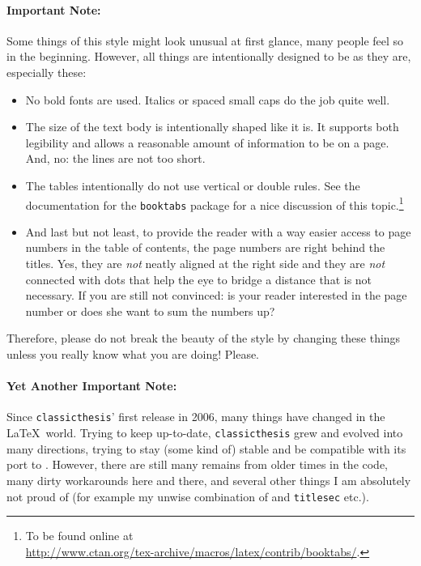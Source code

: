 \paragraph{Important Note:} Some things of this style might look
unusual at first glance, many people feel so in the beginning.
However, all things are intentionally designed to be as they are,
especially these:
\begin{itemize}
    \item No bold fonts are used. Italics or spaced small caps do the
    job quite well.
    \item The size of the text body is intentionally shaped like it
    is. It supports both legibility and allows a reasonable amount of
    information to be on a page. And, no: the lines are not too short.
    \item The tables intentionally do not use vertical or double
    rules. See the documentation for the \texttt{booktabs} package for
    a nice discussion of this topic.\footnote{To be found online at \\
    \url{http://www.ctan.org/tex-archive/macros/latex/contrib/booktabs/}.}
    \item And last but not least, to provide the reader with a way
    easier access to page numbers in the table of contents, the page
    numbers are right behind the titles. Yes, they are \emph{not}
    neatly aligned at the right side and they are \emph{not} connected
    with dots that help the eye to bridge a distance that is not
    necessary. If you are still not convinced: is your reader
    interested in the page number or does she want to sum the numbers
    up?
\end{itemize}
Therefore, please do not break the beauty of the style by changing
these things unless you really know what you are doing! Please.

\paragraph{Yet Another Important Note:} Since \texttt{classicthesis}'
first release in 2006, many things have changed in the \LaTeX\ world. 
Trying to keep up-to-date, \texttt{classicthesis} grew and evolved 
into many directions, trying to stay (some kind of) stable and be 
compatible with its port to \mLyX. However, there are still many 
remains from older times in the code, many dirty workarounds here and 
there, and several other things I am absolutely not proud of (for 
example my unwise combination of  and 
\texttt{titlesec} etc.).

